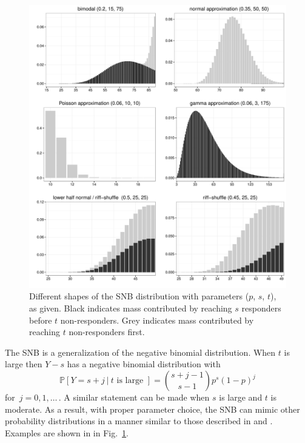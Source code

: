 \documentclass[review]{elsarticle}
\begin{document}
\begin{figure}[p!]
\begin{center}
\includegraphics[width=\textwidth]{shapes.pdf}
\end{center}
\caption{Different shapes of the SNB distribution with parameters 
($p$, $s$, $t$), as given. Black indicates mass contributed by reaching
$s$ responders before $t$ non-responders. Grey indicates
mass contributed by reaching $t$ non-responders first. \label{shapes.fig}}
\end{figure}

The SNB is a generalization of the negative 
binomial distribution. When $t$ is large then $Y-s$ has a 
negative binomial distribution with
\begin{equation*}                                    %
\mathbb{P}[Y=s+j\ |\ t \text{ is large\ }]        \label{nb1.eq}          
  = {{s+j-1}\choose{s-1}} p^s (1-p)^j
\end{equation*}
for $\,j=0, 1,\ldots\,$. A similar statement can be made when $s$ is large
and $t$ is moderate. As a result, with proper parameter choice, the SNB
can mimic other probability distributions in a manner similar to 
those described in \cite{Peizer1968} and \cite{Best1974}. Examples are
shown in in Fig.~\ref{shapes.fig}. 
\end{document}
